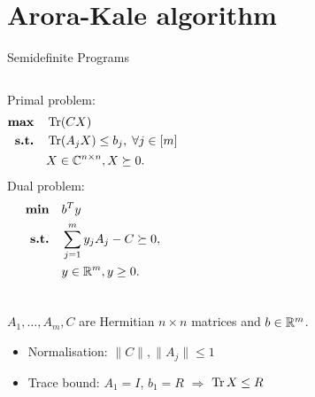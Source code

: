 
\section{Arora-Kale algorithm}

\begin{frame}{Semidefinite Programs}
 \begin{columns}
  Primal problem:
  \begin{align*}
    \textbf{max} & \quad \operatorname{Tr}(CX) \\
    \textbf{s.t.} & \quad \operatorname{Tr}(A_j X) \leq b_j,\;\forall j \in [m] \\
		      & \quad X\in\mathbb{C}^{n\times n}, X \succeq 0.
  \end{align*}
  Dual problem:
  \begin{align*}
    \textbf{min} & \quad b^T y \\
    \textbf{s.t.} & \quad \sum_{j=1}^m y_j A_j - C \succeq 0, \\
		      & \quad y \in\mathbb{R}^m, y \geq 0.
  \end{align*}
 \end{columns}
 
 \vspace{2\floatsep}
 
 $A_1,\dots,A_m,C$ are Hermitian $n\times n$ matrices and $b\in\mathbb{R}^m$.
 
 \vspace{\floatsep}
 
 \pause
 
 \begin{itemize}
  \item Normalisation: $\|C\|, \|A_j\| \leq 1$
  \item Trace bound: $A_1 = I$, $b_1 = R$ $\Rightarrow$ $\operatorname{Tr} X \leq R$
 \end{itemize}

\end{frame}


